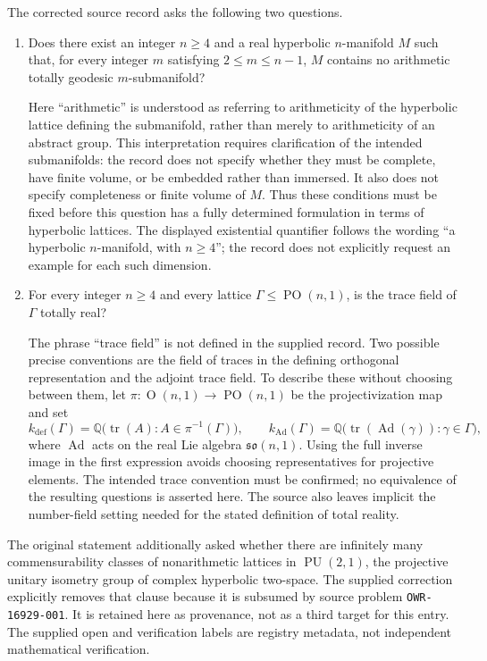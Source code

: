 \documentclass[11pt]{article}
\newcommand{\Q}{\mathbb{Q}}
\begin{document}
The corrected source record asks the following two questions.
\begin{enumerate}
\item Does there exist an integer \(n\geq4\) and a real hyperbolic \(n\)-manifold \(M\) such that, for every integer \(m\) satisfying \(2\leq m\leq n-1\), \(M\) contains no arithmetic totally geodesic \(m\)-submanifold?

Here ``arithmetic'' is understood as referring to arithmeticity of the hyperbolic lattice defining the submanifold, rather than merely to arithmeticity of an abstract group. This interpretation requires clarification of the intended submanifolds: the record does not specify whether they must be complete, have finite volume, or be embedded rather than immersed. It also does not specify completeness or finite volume of \(M\). Thus these conditions must be fixed before this question has a fully determined formulation in terms of hyperbolic lattices. The displayed existential quantifier follows the wording ``a hyperbolic \(n\)-manifold, with \(n\geq4\)''; the record does not explicitly request an example for each such dimension.
\item For every integer \(n\geq4\) and every lattice \(\Gamma\leq\operatorname{PO}(n,1)\), is the trace field of \(\Gamma\) totally real?

The phrase ``trace field'' is not defined in the supplied record. Two possible precise conventions are the field of traces in the defining orthogonal representation and the adjoint trace field. To describe these without choosing between them, let \(\pi:\operatorname{O}(n,1)\to\operatorname{PO}(n,1)\) be the projectivization map and set
\[
 k_{\mathrm{def}}(\Gamma)=\Q\bigl(\operatorname{tr}(A):A\in\pi^{-1}(\Gamma)\bigr),
 \qquad
 k_{\mathrm{Ad}}(\Gamma)=\Q\bigl(\operatorname{tr}(\operatorname{Ad}(\gamma)):\gamma\in\Gamma\bigr),
\]
where \(\operatorname{Ad}\) acts on the real Lie algebra \(\mathfrak{so}(n,1)\). Using the full inverse image in the first expression avoids choosing representatives for projective elements. The intended trace convention must be confirmed; no equivalence of the resulting questions is asserted here. The source also leaves implicit the number-field setting needed for the stated definition of total reality.
\end{enumerate}

The original statement additionally asked whether there are infinitely many commensurability classes of nonarithmetic lattices in \(\operatorname{PU}(2,1)\), the projective unitary isometry group of complex hyperbolic two-space. The supplied correction explicitly removes that clause because it is subsumed by source problem \texttt{OWR-16929-001}. It is retained here as provenance, not as a third target for this entry. The supplied open and verification labels are registry metadata, not independent mathematical verification.
\end{document}
